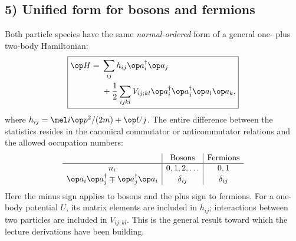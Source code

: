 \subsection*{5) Unified form for bosons and fermions}

Both particle species have the same \emph{normal-ordered} form of a general one- plus two-body Hamiltonian:
\[\boxed{\begin{aligned}
\op H={}&\sum_{ij}h_{ij}\op a_i^\dagger\op a_j\\
 &+\frac12\sum_{ijkl}V_{ij;kl}\op a_i^\dagger\op a_j^\dagger\op a_l\op a_k,
\end{aligned}}\]
where $h_{ij}=\mel i{\op p^2/(2m)+\op U}j$. The entire difference between the statistics resides in the canonical commutator or anticommutator relations and the allowed occupation numbers:
\[\begin{array}{c|c|c}
 &\text{Bosons}&\text{Fermions}\\\hline
n_i&0,1,2,\ldots&0,1\\
\op a_i\op a_j^\dagger\mp\op a_j^\dagger\op a_i
&\delta_{ij}&\delta_{ij}\\
\end{array}\]
Here the minus sign applies to bosons and the plus sign to fermions. For a one-body potential $U$, its matrix elements are included in $h_{ij}$; interactions between two particles are included in $V_{ij;kl}$. This is the general result toward which the lecture derivations have been building.